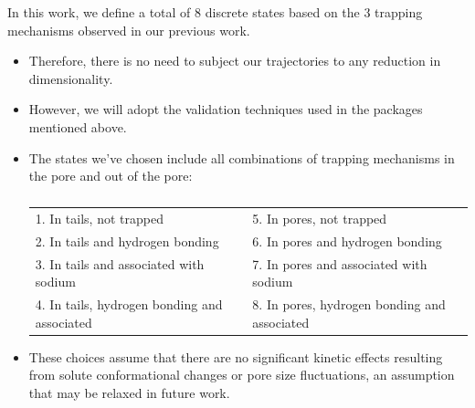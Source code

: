 \documentclass{article}
\begin{document}
  In this work, we define a total of 8 discrete states based on the 3 trapping
  mechanisms observed in our previous work. 
  \begin{itemize}
  	\item Therefore, there is no need to subject our trajectories to any reduction
  	in dimensionality. 
  	\item However, we will adopt the validation techniques used in the packages
  	mentioned above.  
  	\item The states we've chosen include all combinations of trapping mechanisms 
  	in the pore and out of the pore:
    \begin{table}[!htb]
	  \centering
	  \begin{tabular}{ll}
	  \hline
	  1. In tails, not trapped                     & 5. In pores, not trapped                     \\
	  2. In tails and hydrogen bonding             & 6. In pores and hydrogen bonding             \\
	  3. In tails and associated with sodium       & 7. In pores and associated with sodium       \\
	  4. In tails, hydrogen bonding and associated & 8. In pores, hydrogen bonding and associated \\
	  \hline
	  \end{tabular}
	  \caption{}\label{table:water_content}
   \end{table}
  	\item These choices assume that there are no significant kinetic effects resulting
  	from solute conformational changes or pore size fluctuations, an assumption 
  	that may be relaxed in future work.
  \end{itemize}
  
\end{document}
